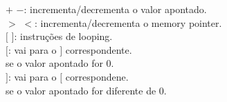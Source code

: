 \documentclass[preview]{standalone}
\begin{document}
$+$ $-$: incrementa/decrementa o valor apontado.\\$>$ $<$: incrementa/decrementa o memory pointer.\\$[$ $]$: instruções de looping.\\$[$: vai para o $]$ correspondente.\\se o valor apontado for 0.\\$]$: vai para o $[$ correspondene.\\se o valor apontado for diferente de 0.\\
\end{document}
